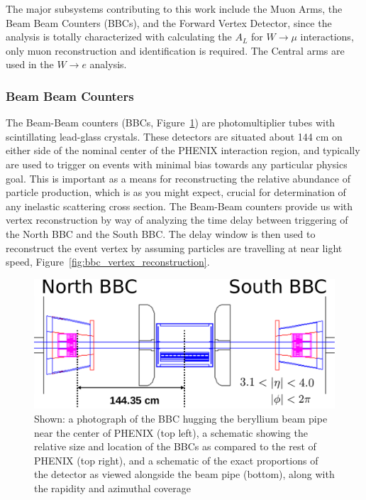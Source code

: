 The major subsystems contributing to this work include the Muon Arms, the Beam
Beam Counters (BBCs), and the Forward Vertex Detector, since the analysis is
totally characterized with calculating the $A_L$ for $W\rightarrow\mu$
interactions, only muon reconstruction and identification is required. The
Central arms are used in the $W\rightarrow e$ analysis. 

\subsubsection{Beam Beam Counters}

The Beam-Beam counters (BBCs, Figure~\ref{fig:bbc_overview}) are photomultiplier
tubes with scintillating lead-glass crystals. These detectors are situated about
144 cm on either side of the nominal center of the PHENIX interaction region,
and typically are used to trigger on events with minimal bias towards any
particular physics goal. This is important as a means for reconstructing the
relative abundance of particle production, which is as you might expect, crucial
for determination of any inelastic scattering cross section. The Beam-Beam
counters provide us with vertex reconstruction by way of analyzing the time
delay between triggering of the North BBC and the South BBC. The delay window is
then used to reconstruct the event vertex by assuming particles are travelling
at near light speed, Figure~\ref{fig:bbc_vertex_reconstruction}. 

\begin{figure}[ht]
  \centering
  \includegraphics[width=\linewidth]{./figures/bbc_overview}
  \caption{
    Shown: a photograph of the BBC hugging the beryllium beam pipe near the
    center of PHENIX (top left), a schematic showing the relative size and
    location of the BBCs as compared to the rest of PHENIX (top right), and a
    schematic of the exact proportions of the detector as viewed alongside the
    beam pipe (bottom), along with the rapidity and azimuthal
    coverage~\cite{Nakamura2002}
  }
  \label{fig:bbc_overview}
\end{figure}

